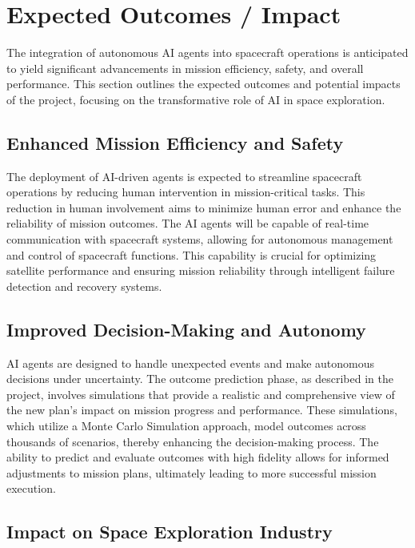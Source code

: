 \documentclass[a4paper,12pt]{article}
\begin{document}
\section{Expected Outcomes / Impact}

The integration of autonomous AI agents into spacecraft operations is anticipated to yield significant advancements in mission efficiency, safety, and overall performance. This section outlines the expected outcomes and potential impacts of the project, focusing on the transformative role of AI in space exploration.

\subsection{Enhanced Mission Efficiency and Safety}

The deployment of AI-driven agents is expected to streamline spacecraft operations by reducing human intervention in mission-critical tasks. This reduction in human involvement aims to minimize human error and enhance the reliability of mission outcomes. The AI agents will be capable of real-time communication with spacecraft systems, allowing for autonomous management and control of spacecraft functions. This capability is crucial for optimizing satellite performance and ensuring mission reliability through intelligent failure detection and recovery systems.

\subsection{Improved Decision-Making and Autonomy}

AI agents are designed to handle unexpected events and make autonomous decisions under uncertainty. The outcome prediction phase, as described in the project, involves simulations that provide a realistic and comprehensive view of the new plan's impact on mission progress and performance. These simulations, which utilize a Monte Carlo Simulation approach, model outcomes across thousands of scenarios, thereby enhancing the decision-making process. The ability to predict and evaluate outcomes with high fidelity allows for informed adjustments to mission plans, ultimately leading to more successful mission execution.

\subsection{Impact on Space Exploration Industry}
\end{document}
